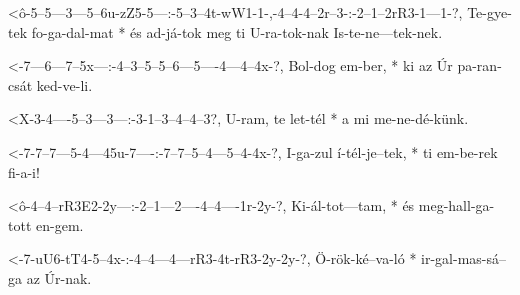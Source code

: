   {<ô-5--5---3---5--6u-zZ5-5---:-5--3--4t-wW1-1-,-4--4-4--2r--3-:-2--1--2rR3-1---1-?,}
  {   Te-gye-tek fo-ga-dal-mat * és ad-já-tok meg ti U-ra-tok-nak Is-te-ne---tek-nek.}


  {<-7---6---7--5x---:-4--3--5--5--6---5----4---4--4x-?,}
  {  Bol-dog em-ber, * ki az Úr pa-ran-csát ked-ve-li.}



  {<X-3-4----5--3---3---:-3-1--3--4--4--3?,}
  {   U-ram, te let-tél * a mi me-ne-dé-künk.}


  {<-7-7--7---5-4---45u-7----:-7--7--5--4---5--4-4x-?,}
  {  I-ga-zul í-tél-je--tek, * ti em-be-rek fi-a-i!}

  {<ô-4--4--rR3E2-2y---:-2--1---2----4--4----1r-2y-?,}
  {   Ki-ál-tot---tam, * és meg-hall-ga-tott en-gem.}


  {<-7-uU6-tT4-5--4x-:-4--4---4---rR3-4t-rR3-2y-2y-?,}
  {  Ö-rök-ké--va-ló * ir-gal-mas-sá--ga az  Úr-nak.}




